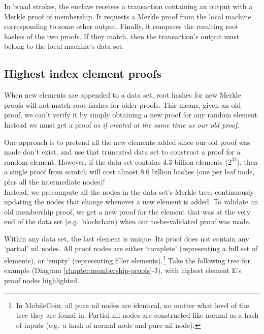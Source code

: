 In broad strokes, the enclave receives a transaction containing an output with a Merkle proof of membership. It requests a Merkle proof from the local machine corresponding to some other output. Finally, it compares the resulting root hashes of the two proofs. If they match, then the transaction's output must belong to the local machine's data set.


\subsection{Highest index element proofs}
\label{subsec:merkle-highest-index-proofs}

When new elements are appended to a data set, root hashes for new Merkle proofs will not match root hashes for older proofs. This means, given an old proof, we can't verify it by simply obtaining a new proof for any random element. Instead we must get a proof {\em as if created at the same time as our old proof}.

One approach is to pretend all the new elements added since our old proof was made don't exist, and use that truncated data set to construct a proof for a random element. However, if the data set contains 4.3 billion elements ($2^{32}$), then a single proof from scratch will cost almost 8.6 billion hashes (one per leaf node, plus all the intermediate nodes)!\\

Instead, we precompute all the nodes in the data set's Merkle tree, continuously updating the nodes that change whenever a new element is added. To validate an old membership proof, we get a new proof for the element that was at the very end of the data set (e.g.\ blockchain) when our to-be-validated proof was made.

Within any data set, the last element is unique. Its proof does not contain any `partial' nil nodes. All proof nodes are either `complete' (representing a full set of elements), or `empty' (representing filler elements).\footnote{In MobileCoin, all pure nil nodes are identical, no matter what level of the tree they are found in. Partial nil nodes are constructed like normal as a hash of inputs (e.g.\ a hash of normal node and pure nil node).} Take the following tree for example (Diagram \ref*{chapter:membership-proofs}-3), with highest element E's proof nodes highlighted.%

